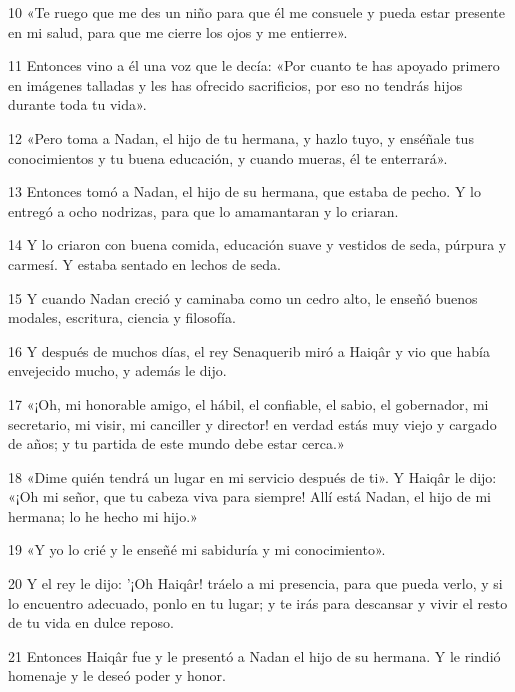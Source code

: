 \par 10 «Te ruego que me des un niño para que él me consuele y pueda estar presente en mi salud, para que me cierre los ojos y me entierre».

\par 11 Entonces vino a él una voz que le decía: «Por cuanto te has apoyado primero en imágenes talladas y les has ofrecido sacrificios, por eso no tendrás hijos durante toda tu vida».

\par 12 «Pero toma a Nadan, el hijo de tu hermana, y hazlo tuyo, y enséñale tus conocimientos y tu buena educación, y cuando mueras, él te enterrará».

\par 13 Entonces tomó a Nadan, el hijo de su hermana, que estaba de pecho. Y lo entregó a ocho nodrizas, para que lo amamantaran y lo criaran.

\par 14 Y lo criaron con buena comida, educación suave y vestidos de seda, púrpura y carmesí. Y estaba sentado en lechos de seda.

\par 15 Y cuando Nadan creció y caminaba como un cedro alto, le enseñó buenos modales, escritura, ciencia y filosofía.

\par 16 Y después de muchos días, el rey Senaquerib miró a Haiqâr y vio que había envejecido mucho, y además le dijo.

\par 17 «¡Oh, mi honorable amigo, el hábil, el confiable, el sabio, el gobernador, mi secretario, mi visir, mi canciller y director! en verdad estás muy viejo y cargado de años; y tu partida de este mundo debe estar cerca.»

\par 18 «Dime quién tendrá un lugar en mi servicio después de ti». Y Haiqâr le dijo: «¡Oh mi señor, que tu cabeza viva para siempre! Allí está Nadan, el hijo de mi hermana; lo he hecho mi hijo.»

\par 19 «Y yo lo crié y le enseñé mi sabiduría y mi conocimiento».

\par 20 Y el rey le dijo: '¡Oh Haiqâr! tráelo a mi presencia, para que pueda verlo, y si lo encuentro adecuado, ponlo en tu lugar; y te irás para descansar y vivir el resto de tu vida en dulce reposo.

\par 21 Entonces Haiqâr fue y le presentó a Nadan el hijo de su hermana. Y le rindió homenaje y le deseó poder y honor.


